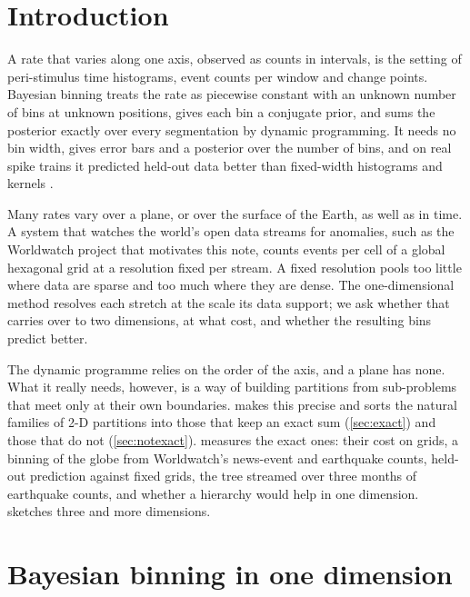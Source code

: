 \documentclass[11pt,a4paper]{article}
\begin{document}
\section{Introduction}

A rate that varies along one axis, observed as counts in intervals, is the setting of
peri-stimulus time histograms, event counts per window and change points. Bayesian binning
\citep{endres2008bayesian} treats the rate as piecewise constant with an unknown number of bins at
unknown positions, gives each bin a conjugate prior, and sums the posterior exactly over every
segmentation by dynamic programming. It needs no bin width, gives error bars and a posterior over
the number of bins, and on real spike trains it predicted held-out data better than fixed-width
histograms and kernels \citep{endres2008bayesian}.

Many rates vary over a plane, or over the surface of the Earth, as well as in time. A system that
watches the world's open data streams for anomalies, such as the Worldwatch project that motivates
this note, counts events per cell of a global hexagonal grid \citep{h3} at a resolution fixed per
stream. A fixed resolution pools too little where data are sparse and too much where they are
dense. The one-dimensional method resolves each stretch at the scale its data support; we ask
whether that carries over to two dimensions, at what cost, and whether the resulting bins predict
better.

The dynamic programme relies on the order of the axis, and a plane has none. What it really
needs, however, is a way of building partitions from sub-problems that meet only at their own
boundaries.  makes this precise and sorts the natural families of 2-D partitions
into those that keep an exact sum (\cref{sec:exact}) and those that do not (\cref{sec:notexact}).
 measures the exact ones: their cost on grids, a binning of the globe from
Worldwatch's news-event and earthquake counts, held-out prediction against fixed grids, the tree
streamed over three months of earthquake counts, and whether a hierarchy would help in one
dimension.  sketches three and more
dimensions.

\section{Bayesian binning in one dimension}\label{sec:oned}
\end{document}
